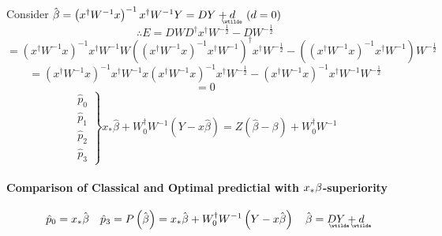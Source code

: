 \documentclass{article}
\begin{document}
\bigskip

Consider $\hat{\beta}=\left( x^{\dagger }W^{-1}x\right) ^{-1}x^{\dagger
}W^{-1}Y=DY+%
\underaccent{\wtilde}{d}%
\quad (d=0)$%
\begin{equation*}
\therefore E=DWD^{\dagger }x^{\dagger }W^{-\frac{1}{2}}-DW^{-\frac{1}{2}}
\end{equation*}%
\begin{equation*}
=\left( x^{\dagger }W^{-1}x\right) ^{-1}x^{\dagger }W^{-1}W\left( \left(
x^{\dagger }W^{-1}x\right) ^{-1}x^{\dagger }W^{-1}\right) ^{\dagger
}x^{\dagger }W^{-\frac{1}{2}}-\left( \left( x^{\dagger }W^{-1}x\right)
^{-1}x^{\dagger }W^{-1}\right) W^{-\frac{1}{2}}
\end{equation*}%
\begin{equation*}
=\left( x^{\dagger }W^{-1}x\right) ^{-1}x^{\dagger }W^{-1}x\left( x^{\dagger
}W^{-1}x\right) ^{-1}x^{\dagger }W^{-\frac{1}{2}}-\left( x^{\dagger
}W^{-1}x\right) ^{-1}x^{\dagger }W^{-1}W^{-\frac{1}{2}}
\end{equation*}%
\begin{equation*}
=0
\end{equation*}%
\begin{equation*}
\left. 
\begin{array}{c}
\hat{p}_{0} \\ 
\hat{p}_{1} \\ 
\hat{p}_{2} \\ 
\hat{p}_{3}%
\end{array}%
\right\} x_{\ast }\hat{\beta}+W_{0}^{\dagger }W^{-1}\left( Y-x\hat{\beta}%
\right) =Z\left( \hat{\beta}-\beta \right) +W_{0}^{\dagger }W^{-1}
\end{equation*}

\bigskip

\paragraph{Comparison of Classical and Optimal predictial with $x_{\ast }%
\protect\beta $-superiority}

\begin{equation*}
\hat{p}_{0}=x_{\ast }\hat{\beta}\quad \hat{p}_{3}=P\left( \hat{\beta}\right)
=x_{\ast }\hat{\beta}+W_{0}^{\dagger }W^{-1}\left( Y-x\hat{\beta}\right)
\quad \hat{\beta}=D%
\underaccent{\wtilde}{Y}%
+%
\underaccent{\wtilde}{d}%
\end{equation*}
\end{document}
